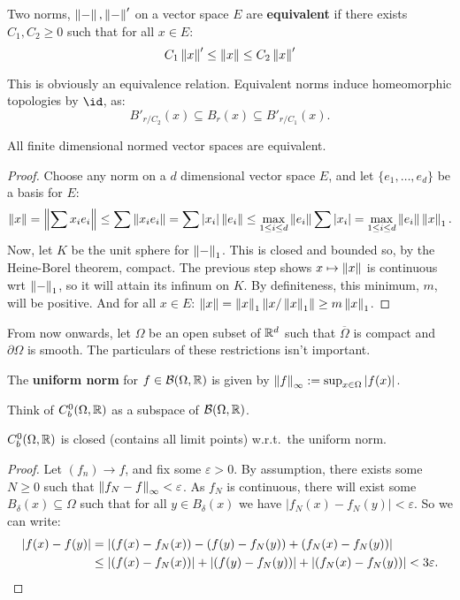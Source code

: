 \documentclass{article}
\begin{document}
\begin{definition}
    Two norms, $\left\lVert - \right\rVert,\left\lVert - \right\rVert'$ on a vector space $E$ are \textbf{equivalent} if there exists $C_1,C_2\geq 0$ such that for all $x\in E$: \[
        C_1\left\lVert x \right\rVert' \leq \left\lVert x \right\rVert \leq C_2\left\lVert x \right\rVert'
    \]
\end{definition}
This is obviously an equivalence relation. Equivalent norms induce homeomorphic topologies by $\id$, as:\[
    B'_{r/C_2}(x)\subseteq B_r(x)\subseteq B'_{r/C_1}(x).
\]

\begin{proposition}
    All finite dimensional normed vector spaces are equivalent.\begin{proof}
        Choose any norm on a $d$ dimensional vector space $E$, and let $\{e_1,\ldots,e_d\}$ be a basis for $E$: \[
        \left\lVert x \right\rVert = \left\lVert \sum x_ie_i \right\rVert \leq \sum\left\lVert x_ie_i \right\rVert = \sum \left| x_i \right|\left\lVert e_i \right\rVert\leq \max_{1\leq i\leq d}\left\lVert e_i \right\rVert\sum\left| x_i \right| = \max_{1\leq i\leq d}\left\lVert e_i \right\rVert\left\lVert x \right\rVert_1.
        \] Now, let $K$ be the unit sphere for $\left\lVert - \right\rVert_1$. This is closed and bounded so, by the Heine-Borel theorem, compact. The previous step shows $x\mapsto\left\lVert x \right\rVert$ is continuous wrt $\left\lVert - \right\rVert_1$, so it will attain its infinum on $K$. By definiteness, this minimum, $m$, will be positive. And for all $x\in E$: $\left\lVert x \right\rVert=\left\lVert x \right\rVert_1 \left\lVert x/\left\lVert x \right\rVert_1 \right\rVert\geq m\left\lVert x \right\rVert_1$.
    \end{proof}
\end{proposition}

From now onwards, let $\Omega$ be an open subset of $\mathbb{R}^d$ such that $\overline{\Omega}$ is compact and $\partial\Omega$ is smooth. The particulars of these restrictions isn't important.

\begin{definition}
    The \textbf{uniform norm} for $f\in \mathcal{B}(\Omega,\mathbb{R})$ is given by $\left\lVert f \right\rVert_\infty := \sup_{x\in \Omega}\left| f(x) \right|$.
\end{definition}

Think of $C_b^0(\Omega,\mathbb{R})$ as a subspace of $\mathcal{B}(\Omega,\mathbb{R})$.

\begin{proposition}
    $C_b^0(\Omega,\mathbb{R})$ is closed (contains all limit points) w.r.t.~the uniform norm.
    \begin{proof}
        Let $(f_n)\rightarrow f$, and fix some $\varepsilon > 0$. By assumption, there exists some $N\geq 0$ such that $\left\lVert f_N-f \right\rVert_\infty < \varepsilon$. As $f_N$ is continuous, there will exist some $B_\delta(x)\subseteq \Omega$ such that for all $y\in B_\delta(x)$ we have $|f_N(x)-f_N(y)| < \varepsilon$. So we can write: \begin{align*}
            \left| f(x)-f(y) \right| &= \left| (f(x)-f_N(x)) - (f(y)-f_N(y)) + (f_N(x)-f_N(y)) \right|\\
            &\leq \left| (f(x)-f_N(x)) \right| + \left| (f(y)-f_N(y)) \right| + \left| (f_N(x)-f_N(y)) \right| < 3\varepsilon. \qedhere
        \end{align*}
    \end{proof}
\end{proposition}
\end{document}
